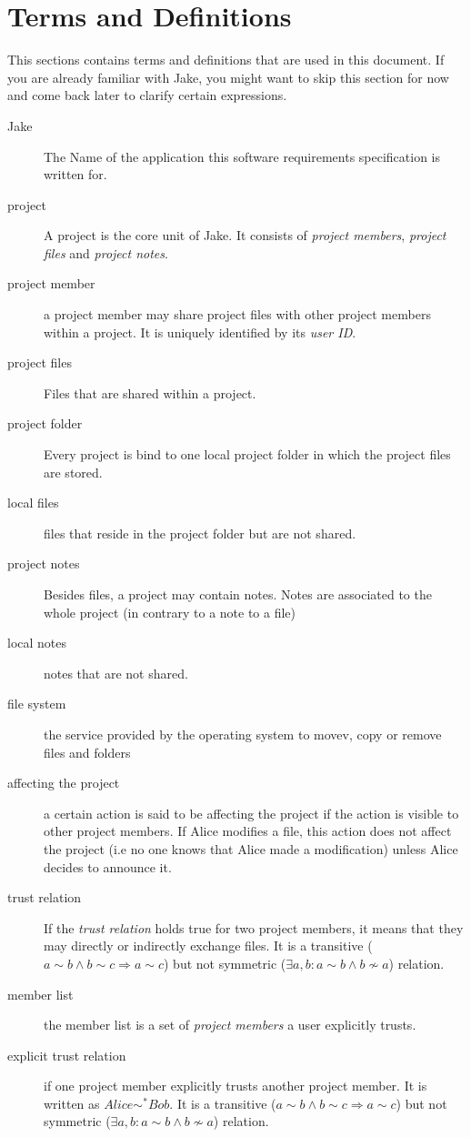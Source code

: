 \section{Terms and Definitions}
This sections contains terms and definitions that are used in this document. If you are already familiar with Jake, you might want to skip this section for now and come back later to clarify certain expressions.
\begin{description}

\item[Jake] The Name of the application this software requirements specification is written for.
\item[project] A project is the core unit of Jake. It consists of \emph{project members}, \emph{project files} and \emph{project notes}.
\item[project member] a project member may share project files with other project members within a project. It is uniquely identified by its \emph{user ID}.
\item[project files] Files that are shared within a project.
\item[project folder] Every project is bind to one local project folder in which the project files are stored.
\item[local files] files that reside in the project folder but are not shared.
\item[project notes] Besides files, a project may contain notes. Notes  are associated to the whole project (in contrary to a note to a file)
\item[local notes] notes that are not shared.
\item[file system] the service provided by the operating system to movev, copy or remove files and folders
\item[affecting the project] a certain action is said to be affecting the project if the action is visible to other project members. If Alice modifies a file, this action does not affect the project (i.e no one knows that Alice made a modification) unless Alice decides to announce it.
\item[trust relation] If the \emph{trust relation} holds true for two project members, it means that they may directly or indirectly exchange files. It is a transitive ($a \sim b \wedge b \sim c \Rightarrow a \sim c$) but not symmetric ($\exists a, b: a \sim b \wedge b \not\sim a$) relation. 
\item[member list] the member list is a set of \emph{project members} a user explicitly trusts.
\item[explicit trust relation] if one project member explicitly trusts another project member. It is written as $Alice \sim ^* Bob$. It is a transitive ($a \sim b \wedge b \sim c \Rightarrow a \sim c$) but not symmetric ($\exists a, b: a \sim b \wedge b \not\sim a$) relation. 

\end{description}
